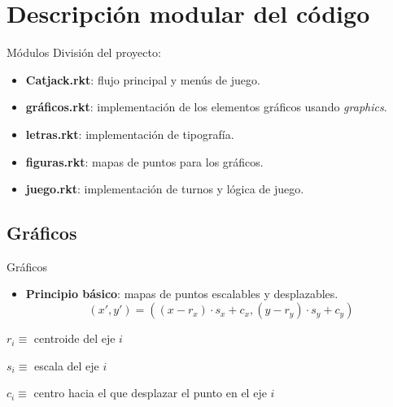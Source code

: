 \section{Descripción modular del código} %


\begin{frame}{Módulos}
    División del proyecto:
    \begin{itemize}
        \item \textbf{Catjack.rkt}: flujo principal y menús de juego.
        \item \textbf{gráficos.rkt}: implementación de los elementos gráficos usando \textit{graphics}.
        \item \textbf{letras.rkt}: implementación de tipografía.
        \item \textbf{figuras.rkt}: mapas de puntos para los gráficos.
        \item \textbf{juego.rkt}: implementación de turnos y lógica de juego.
    \end{itemize}
\end{frame}

\subsection{Gráficos}
\begin{frame}{Gráficos}
	\begin{itemize}
		\item \textbf{Principio básico}: mapas de puntos escalables y desplazables.
		\[
		(x', y') = \left( (x - r_x) \cdot s_x + c_x, (y - r_y) \cdot s_y + c_y \right)
		\]
	\end{itemize}
	\begin{center}
		\small
		\item $r_i \equiv$ centroide del eje $i$
		\item $s_i \equiv$ escala del eje $i$
		\item $c_i \equiv$ centro hacia el que desplazar el punto en el eje $i$
	\end{center}
\end{frame}



